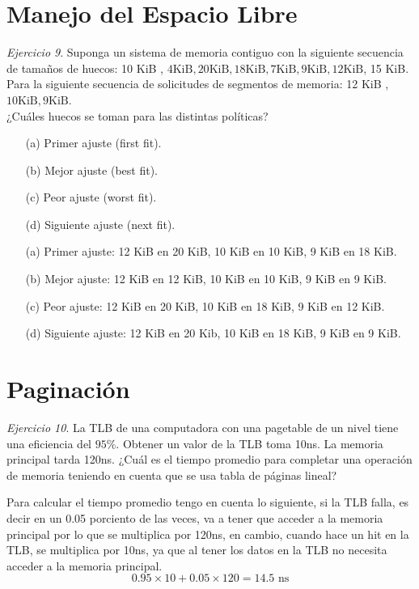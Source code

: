 \documentclass[12pt]{article}
\begin{document}
\section*{Manejo del Espacio Libre}
\noindent \textit{Ejercicio 9}. Suponga un sistema de memoria contiguo con la siguiente secuencia de tamaños de huecos: 10 KiB , $4 \mathrm{KiB}, 20 \mathrm{KiB}, 18 \mathrm{KiB}, 7 \mathrm{KiB}, 9 \mathrm{KiB}, 12 \mathrm{KiB}$, 15 KiB.
Para la siguiente secuencia de solicitudes de segmentos de memoria: 12 KiB , $10 \mathrm{KiB}, 9 \mathrm{KiB}$.\\
¿Cuáles huecos se toman para las distintas políticas?
\begin{itemize}
    \item[(a)] Primer ajuste (first fit).
    \item[(b)] Mejor ajuste (best fit).
    \item[(c)] Peor ajuste (worst fit).
    \item[(d)] Siguiente ajuste (next fit).
\end{itemize}

\begin{rta}
    \begin{itemize}
        \item[(a)] Primer ajuste: 12 KiB en 20 KiB, 10 KiB en 10 KiB, 9 KiB en 18 KiB.
        \item[(b)] Mejor ajuste: 12 KiB en 12 KiB, 10 KiB en 10 KiB, 9 KiB en 9 KiB.
        \item[(c)] Peor ajuste: 12 KiB en 20 KiB, 10 KiB en 18 KiB, 9 KiB en 12 KiB.
        \item[(d)] Siguiente ajuste: 12 KiB en 20 Kib, 10 KiB en 18 KiB, 9 KiB en 9 KiB.
    \end{itemize}
\end{rta}

\newpage
\section*{Paginación}
\noindent \textit{Ejercicio 10}. La TLB de una computadora con una pagetable de un nivel tiene una eficiencia del $95 \%$. Obtener un valor de la TLB toma 10ns. La memoria principal tarda 120ns. ¿Cuál es el tiempo promedio para completar una operación de memoria teniendo en cuenta que se usa tabla de páginas lineal?

\begin{rta}
    Para calcular el tiempo promedio tengo en cuenta lo siguiente, si la TLB falla, es decir en un 0.05 porciento de las veces, va a tener que acceder a la memoria principal por lo que se multiplica por 120ns, en cambio, cuando hace un hit en la TLB, se multiplica por 10ns, ya que al tener los datos en la TLB no necesita acceder a la memoria principal.
    \begin{equation*}
        0.95 \times 10 + 0.05 \times 120 = 14.5 \text{ ns}
    \end{equation*}
\end{rta}
\end{document}
